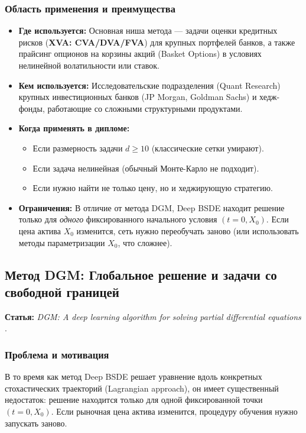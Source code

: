 \subsubsection{Область применения и преимущества}
\begin{itemize}
    \item \textbf{Где используется:} Основная ниша метода — задачи оценки кредитных рисков (\textbf{XVA: CVA/DVA/FVA}) для крупных портфелей банков, а также прайсинг опционов на корзины акций (Basket Options) в условиях нелинейной волатильности или ставок.
    \item \textbf{Кем используется:} Исследовательские подразделения (Quant Research) крупных инвестиционных банков (JP Morgan, Goldman Sachs) и хедж-фонды, работающие со сложными структурными продуктами.
    \item \textbf{Когда применять в дипломе:}
    \begin{itemize}
        \item Если размерность задачи $d \ge 10$ (классические сетки умирают).
        \item Если задача нелинейная (обычный Монте-Карло не подходит).
        \item Если нужно найти не только цену, но и хеджирующую стратегию.
    \end{itemize}
    \item \textbf{Ограничения:} В отличие от метода DGM, Deep BSDE находит решение только для \textit{одного} фиксированного начального условия $(t=0, X_0)$. Если цена актива $X_0$ изменится, сеть нужно переобучать заново (или использовать методы параметризации $X_0$, что сложнее).
\end{itemize}

\subsection{Метод DGM: Глобальное решение и задачи со свободной границей}
\textbf{Статья:} \textit{DGM: A deep learning algorithm for solving partial differential equations} \cite{Sirignano2018}.

\subsubsection{Проблема и мотивация}
В то время как метод Deep BSDE решает уравнение вдоль конкретных стохастических траекторий (Lagrangian approach), он имеет существенный недостаток: решение находится только для одной фиксированной точки $(t=0, X_0)$. Если рыночная цена актива изменится, процедуру обучения нужно запускать заново.

